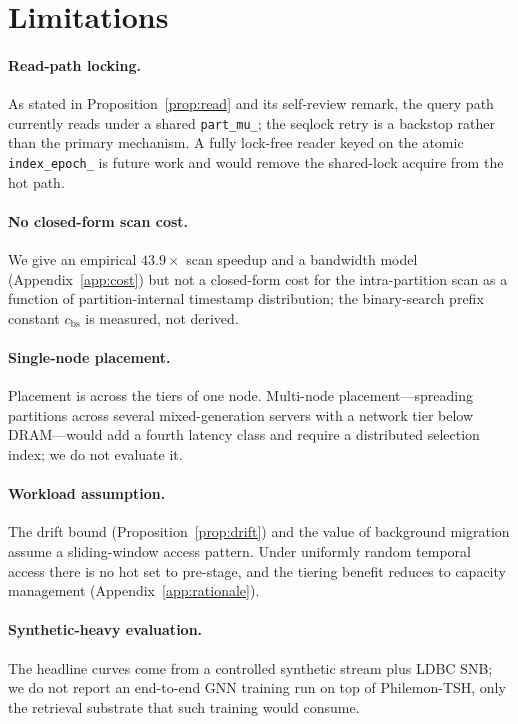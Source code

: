 \documentclass[10pt]{article}
\theoremstyle{definition}
\begin{document}
\section{Limitations}
\label{app:limitations}

\paragraph{Read-path locking.}
As stated in Proposition~\ref{prop:read} and its self-review remark, the query path currently reads under a
shared \texttt{part\_mu\_}; the seqlock retry is a backstop rather than the primary mechanism. A fully
lock-free reader keyed on the atomic \texttt{index\_epoch\_} is future work and would remove the shared-lock
acquire from the hot path.

\paragraph{No closed-form scan cost.}
We give an empirical $43.9\times$ scan speedup and a bandwidth model (Appendix~\ref{app:cost}) but not a
closed-form cost for the intra-partition scan as a function of partition-internal timestamp distribution; the
binary-search prefix constant $c_{\mathrm{bs}}$ is measured, not derived.

\paragraph{Single-node placement.}
Placement is across the tiers of one node. Multi-node placement---spreading partitions across several
mixed-generation servers with a network tier below DRAM---would add a fourth latency class and require a
distributed selection index; we do not evaluate it.

\paragraph{Workload assumption.}
The drift bound (Proposition~\ref{prop:drift}) and the value of background migration assume a sliding-window
access pattern. Under uniformly random temporal access there is no hot set to pre-stage, and the tiering
benefit reduces to capacity management (Appendix~\ref{app:rationale}).

\paragraph{Synthetic-heavy evaluation.}
The headline curves come from a controlled synthetic stream plus LDBC SNB; we do not report an end-to-end GNN
training run on top of Philemon-TSH, only the retrieval substrate that such training would consume.
\end{document}
